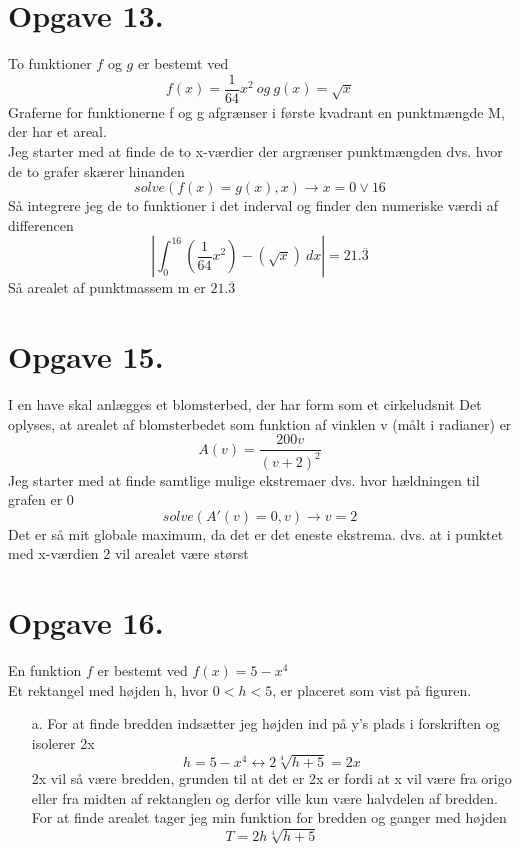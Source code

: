 \documentclass[12pt]{article}
\begin{document}
\section*{Opgave 13.}
  To funktioner $f$ og $g$ er bestemt ved
  $$f(x)=\frac{1}{64}x^2 \ og \ g(x)=\sqrt{x}$$
  Graferne for funktionerne f og g afgrænser i første kvadrant en punktmængde M, der har
  et areal.\\
  Jeg starter med at finde de to x-værdier der argrænser punktmængden dvs. hvor de to grafer skærer hinanden
  $$solve(f(x)=g(x),x) \rightarrow x=0 \vee 16$$
  Så integrere jeg de to funktioner i det inderval og finder den numeriske værdi af differencen
  $$|\int_{0}^{16} (\frac{1}{64}x^2)-(\sqrt{x}) \ dx|=21. \overline{3}$$
  Så arealet af punktmassem m er $21. \overline{3}$

\section*{Opgave 15.}
  I en have skal anlægges et blomsterbed, der har form som et cirkeludsnit
  Det oplyses, at arealet af blomsterbedet som funktion af vinklen v (målt i radianer) er
  $$A(v)=\frac{200v}{(v+2)^2}$$
  Jeg starter med at finde samtlige mulige ekstremaer dvs. hvor hældningen til grafen er 0
  $$solve(A'(v)=0,v) \rightarrow v=2$$
  Det er så mit globale maximum, da det er det eneste ekstrema.
  dvs. at i punktet med x-værdien 2 vil arealet være størst

\section*{Opgave 16.}
  En funktion $f$ er bestemt ved $f(x)=5-x^4$\\
  Et rektangel med højden h, hvor $0 < h < 5$, er placeret som vist på figuren.
  \begin{enumerate}
    \item[a.] For at finde bredden indsætter jeg højden ind på y's plads i forskriften og isolerer 2x
    $$h=5-x^4 \leftrightarrow 2\sqrt[4]{h+5}=2x$$
    2x vil så være bredden, grunden til at det er 2x er fordi at x vil være fra origo eller fra midten af rektanglen og derfor ville kun være
    halvdelen af bredden.\\
    For at finde arealet tager jeg min funktion for bredden og ganger med højden
    $$T=2h\sqrt[4]{h+5}$$
  \end{enumerate}
\end{document}
